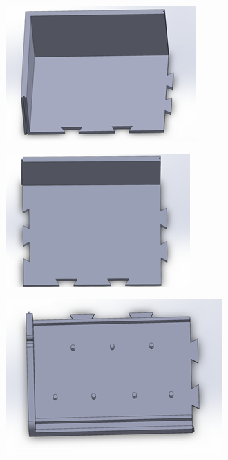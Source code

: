 \begin{figure}[h!]
  \centering
  \begin{subfigure}[b]{0.45\textwidth}
    \centering
    \includegraphics[width=\textwidth]{image/BodyModel3.png}
  \end{subfigure}
  \begin{subfigure}[b]{0.45\textwidth}
    \centering
    \includegraphics[width=\textwidth]{image/BodyModel4.png}
  \end{subfigure}
  \begin{subfigure}[b]{0.45\textwidth}
    \centering
    \includegraphics[width=\textwidth]{image/BodyModel5.png}

\end{subfigure}
\end{figure}
